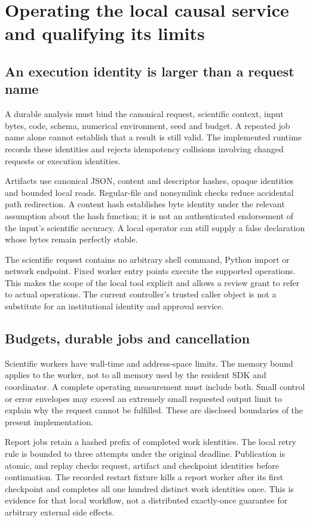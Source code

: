 \chapter{Operating the local causal service and qualifying its limits}
\label{in:operations}

\section{An execution identity is larger than a request name}

A durable analysis must bind the canonical request, scientific context, input
bytes, code, schema, numerical environment, seed and budget. A repeated job
name alone cannot establish that a result is still valid. The implemented
runtime records these identities and rejects idempotency collisions involving
changed requests or execution identities.\cite{v12_in_runtime}

Artifacts use canonical JSON, content and descriptor hashes, opaque identities
and bounded local reads. Regular-file and nonsymlink checks reduce accidental
path redirection. A content hash establishes byte identity under the relevant
assumption about the hash function; it is not an authenticated endorsement of
the input's scientific accuracy. A local operator can still supply a false
declaration whose bytes remain perfectly stable.

The scientific request contains no arbitrary shell command, Python import or
network endpoint. Fixed worker entry points execute the supported operations.
This makes the scope of the local tool explicit and allows a review grant to
refer to actual operations. The current controller's trusted caller object is
not a substitute for an institutional identity and approval service.

\section{Budgets, durable jobs and cancellation}

Scientific workers have wall-time and address-space limits. The memory bound
applies to the worker, not to all memory used by the resident SDK and
coordinator. A complete operating measurement must include both. Small control
or error envelopes may exceed an extremely small requested output limit to
explain why the request cannot be fulfilled. These are disclosed boundaries of
the present implementation.\cite{v12_in_runtime}

Report jobs retain a hashed prefix of completed work identities. The local
retry rule is bounded to three attempts under the original deadline. Publication
is atomic, and replay checks request, artifact and checkpoint identities before
continuation. The recorded restart fixture kills a report worker after its
first checkpoint and completes all one hundred distinct work identities once.
This is evidence for that local workflow, not a distributed exactly-once
guarantee for arbitrary external side effects.

